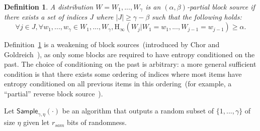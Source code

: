 \documentclass[11pt]{article}
\newcommand{\defref}[1]{\mbox{Definition~\ref{#1}}}
\newcommand{\class}[1]{{\ensuremath{\mathsf{#1}}}}
\newcommand{\sample}{\ensuremath{\class{Sample}}\xspace}
\newcommand{\Hoo}{\mathrm{H}_\infty}
\newtheorem{definition}[theorem]{Definition}
\newcommand{\authnote}[2]{{\textcolor{red}{\textsf{#1 notes: }\textcolor{blue}{ #2}}\marginpar{\textcolor{red}{\textbf{!!!!!}}}}}
\newcommand{\authnote}[2]{}
\newcommand{\lnote}[1]{{\authnote{Leo}{#1}}}
\begin{document}
\begin{definition}
\label{def:partial source}
A distribution $W = W_1,..., W_\gamma$ is an $(\alpha, \beta)$-partial block source if there exists a set of indices $J$ where $|J| \geq \gamma - \beta$ such that the following holds:
\[
\forall j\in J, \forall w_1,..., w_\gamma \in W_1,..., W_\gamma, \Hoo(W_j | W_1 = w_1,..., W_{j-1}=w_{j-1}) \geq \alpha.
\]
\end{definition}

\defref{def:partial source} is a weakening of block sources~(introduced by Chor and Goldreich~\cite{DBLP:journals/siamcomp/ChorG88}), as only some blocks are required to have entropy conditioned on the past.  The choice of conditioning on the past is arbitrary: a more general sufficient condition is that there exists some ordering of indices where most items have entropy conditioned on all previous items in this ordering~(for example, a ``partial'' reverse block source~\cite{vadhan2003constructing}).

Let $\sample_{\gamma, \eta}(\cdot)$ be an algorithm that  outputs a random subset of $\{1,..., \gamma\}$ of size $\eta$ given let $r_{sam}$ bits of randomness.
\end{document}
